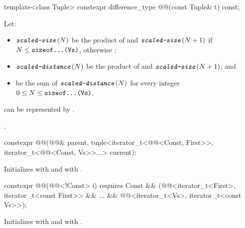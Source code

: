 \begin{itemdecl}
template<class Tuple>
  constexpr difference_type @@(const Tuple& t) const;
\end{itemdecl}

\begin{itemdescr}
\pnum
Let:
\begin{itemize}
\item
$\texttt{\protect\textit{scaled-size}}(N)$ be the product of
 and
$\texttt{\protect\textit{scaled-size}}(N+1)$
if $N \le \texttt{\protect sizeof...(Vs)}$, otherwise ;
\item
$\texttt{\protect\textit{scaled-distance}}(N)$ be the product of
 and $\texttt{\protect\textit{scaled-size}}(N+1)$; and
\item
{} be the sum of $\texttt{\protect\textit{scaled-distance}}(N)$
for every integer $0 \le N \le \texttt{\protect sizeof...(Vs)}$.
\end{itemize}

\pnum
\expects
{} can be represented by .

\pnum
\returns
{}.
\end{itemdescr}

\begin{itemdecl}
constexpr @@(@@& parent, tuple<iterator_t<@@<Const, First>>,
  iterator_t<@@<Const, Vs>>...> current);
\end{itemdecl}

\begin{itemdescr}
\pnum
\effects
Initializes
 with  and
 with .
\end{itemdescr}

\begin{itemdecl}
constexpr @@(@@<!Const> i) requires Const &&
  (@@<iterator_t<First>, iterator_t<const First>> &&
    ... && @@<iterator_t<Vs>, iterator_t<const Vs>>);
\end{itemdecl}

\begin{itemdescr}
\pnum
\effects
Initializes
 with  and
 with .
\end{itemdescr}

